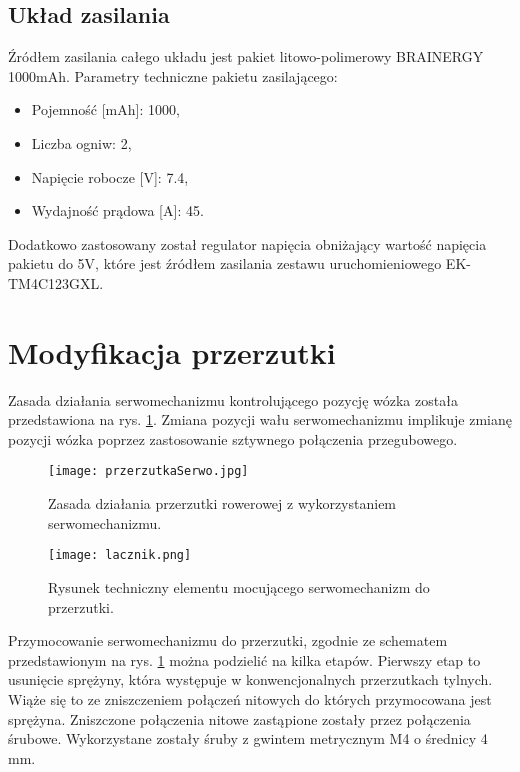 \subsection{Układ zasilania}
Źródłem zasilania całego układu jest pakiet litowo-polimerowy BRAINERGY 1000mAh.
Parametry techniczne pakietu zasilającego:
\begin{itemize}
\item
Pojemność [mAh]: 1000,
\item
Liczba ogniw: 2,
\item
Napięcie robocze [V]: 7.4,
\item
Wydajność prądowa [A]: 45.
\end{itemize}

Dodatkowo zastosowany został regulator napięcia obniżający wartość napięcia pakietu do 5V, które jest źródłem zasilania zestawu uruchomieniowego EK-TM4C123GXL.



\section{Modyfikacja przerzutki}
 Zasada działania serwomechanizmu kontrolującego pozycję wózka została przedstawiona na rys. \ref{fig:przerzutkaSerwo}. Zmiana pozycji wału serwomechanizmu implikuje zmianę pozycji wózka poprzez zastosowanie sztywnego połączenia przegubowego.
 \begin{figure}[h]
    \centering
    \texttt{[image: przerzutkaSerwo.jpg]}
    \caption{Zasada działania przerzutki rowerowej z wykorzystaniem serwomechanizmu.}
    \label{fig:przerzutkaSerwo}
\end{figure}

\begin{figure}[h]
    \centering
    \texttt{[image: lacznik.png]}
    \caption{Rysunek techniczny elementu mocującego serwomechanizm do przerzutki.}
    \label{fig:lacznik}
\end{figure}

Przymocowanie serwomechanizmu do przerzutki, zgodnie ze schematem przedstawionym na rys. \ref{fig:przerzutkaSerwo}  można podzielić na kilka etapów.
Pierwszy etap to usunięcie sprężyny, która występuje w konwencjonalnych przerzutkach tylnych. Wiąże się to ze zniszczeniem połączeń nitowych do których przymocowana jest sprężyna. Zniszczone połączenia nitowe zastąpione zostały przez połączenia śrubowe. Wykorzystane zostały śruby z gwintem metrycznym M4 o średnicy 4 mm.

